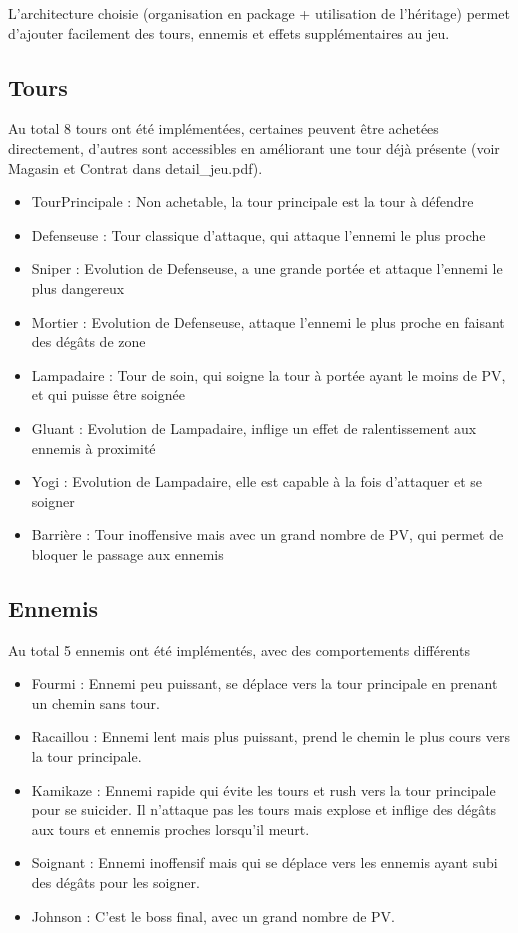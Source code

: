 \documentclass{article}
\begin{document}
L'architecture choisie (organisation en package + utilisation de l'héritage) permet d'ajouter facilement des tours, ennemis et effets supplémentaires au jeu.

\subsection{Tours}

Au total 8 tours ont été implémentées, certaines peuvent être achetées directement, d'autres sont accessibles en améliorant une tour déjà présente (voir Magasin et Contrat dans detail\_jeu.pdf).

\begin{itemize}
\item
  TourPrincipale : Non achetable, la tour principale est la tour à défendre
\item
  Defenseuse : Tour classique d'attaque, qui attaque l'ennemi le plus proche
\item
  Sniper : Evolution de Defenseuse, a une grande portée et attaque l'ennemi le plus dangereux
\item
  Mortier : Evolution de Defenseuse, attaque l'ennemi le plus proche en faisant des dégâts de zone
\item
  Lampadaire : Tour de soin, qui soigne la tour à portée ayant le moins de PV, et qui puisse être soignée
\item
  Gluant : Evolution de Lampadaire, inflige un effet de ralentissement aux ennemis à proximité
\item
  Yogi : Evolution de Lampadaire, elle est capable à la fois d'attaquer et se soigner
\item
  Barrière : Tour inoffensive mais avec un grand nombre de PV, qui permet de bloquer le passage aux ennemis
\end{itemize}

\subsection{Ennemis}

Au total 5 ennemis ont été implémentés, avec des comportements différents

\begin{itemize}
\item
  Fourmi : Ennemi peu puissant, se déplace vers la tour principale en prenant un chemin sans tour.
\item
  Racaillou : Ennemi lent mais plus puissant, prend le chemin le plus cours vers la tour principale.
\item
  Kamikaze : Ennemi rapide qui évite les tours et rush vers la tour principale pour se suicider. Il n'attaque pas les tours mais explose et inflige des dégâts aux tours et ennemis proches lorsqu'il meurt.
\item
  Soignant : Ennemi inoffensif mais qui se déplace vers les ennemis ayant subi des dégâts pour les soigner.
\item
  Johnson : C'est le boss final, avec un grand nombre de PV.
\end{itemize}
\end{document}
